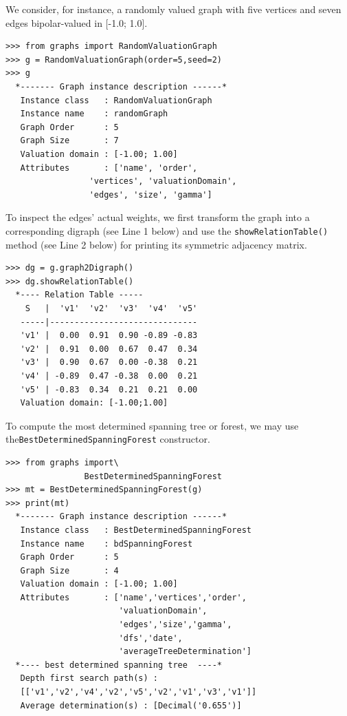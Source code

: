 We consider, for instance, a randomly valued graph with five vertices and seven edges bipolar-valued in [-1.0; 1.0].
\begin{lstlisting}[caption={Generating randomly bipolar-valued graphs.},label=list:22.7]
>>> from graphs import RandomValuationGraph
>>> g = RandomValuationGraph(order=5,seed=2)
>>> g
  *------- Graph instance description ------*
   Instance class   : RandomValuationGraph
   Instance name    : randomGraph
   Graph Order      : 5
   Graph Size       : 7
   Valuation domain : [-1.00; 1.00]
   Attributes       : ['name', 'order',
                 'vertices', 'valuationDomain',
                 'edges', 'size', 'gamma']
\end{lstlisting}
To inspect the edges' actual weights, we first transform the graph into a corresponding digraph (see Line 1 below) and use the \texttt{showRelationTable()} method (see Line 2 below) for printing its symmetric adjacency matrix. 
\begin{lstlisting}[caption={Symmetric relation table},label=list:22.8]
>>> dg = g.graph2Digraph()
>>> dg.showRelationTable()
  *---- Relation Table -----
    S   |  'v1'	 'v2'  'v3'  'v4'  'v5'	  
   -----|------------------------------
   'v1' |  0.00	 0.91  0.90 -0.89 -0.83	 
   'v2' |  0.91	 0.00  0.67  0.47  0.34	 
   'v3' |  0.90	 0.67  0.00 -0.38  0.21	 
   'v4' | -0.89	 0.47 -0.38  0.00  0.21	 
   'v5' | -0.83	 0.34  0.21  0.21  0.00	 
   Valuation domain: [-1.00;1.00]
\end{lstlisting}

To compute the most determined spanning tree or forest, we may use the\texttt{BestDeterminedSpanningForest} constructor.
\begin{lstlisting}[caption={Computing best determined spanning forests.},label=list:22.9]
>>> from graphs import\
                BestDeterminedSpanningForest
>>> mt = BestDeterminedSpanningForest(g)
>>> print(mt)
  *------- Graph instance description ------*
   Instance class   : BestDeterminedSpanningForest
   Instance name    : bdSpanningForest
   Graph Order      : 5
   Graph Size       : 4
   Valuation domain : [-1.00; 1.00]
   Attributes       : ['name','vertices','order',
                       'valuationDomain',
                       'edges','size','gamma',
                       'dfs','date',
                       'averageTreeDetermination']
  *---- best determined spanning tree  ----*
   Depth first search path(s) :
   [['v1','v2','v4','v2','v5','v2','v1','v3','v1']]
   Average determination(s) : [Decimal('0.655')]
\end{lstlisting}

